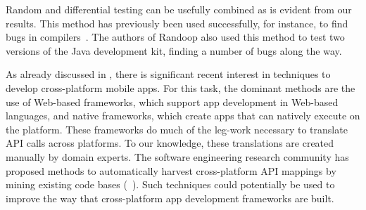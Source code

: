 Random and differential testing can be usefully combined as is evident from our
results. This method has previously been used successfully, for instance, to
find bugs in compilers~\cite{csmith:pldi11}. The authors of Randoop also used
this method to test two versions of the Java development kit, finding a number
of bugs along the way.


%
As already discussed in , there is significant
recent interest in techniques to develop cross-platform mobile apps. For this
task, the dominant methods are the use of Web-based frameworks, which support
app development in Web-based languages, and native frameworks, which create
apps that can natively execute on the platform. These frameworks do much of the
leg-work necessary to translate API calls across platforms. To our knowledge,
these translations are created manually by domain experts. The software
engineering research community has proposed methods to automatically harvest
cross-platform API mappings by mining existing code bases
(\eg~\cite{mam:icse10,rosetta:icse13,robillard:tse}). Such techniques could
potentially be used to improve the way that cross-platform app development
frameworks are built.



